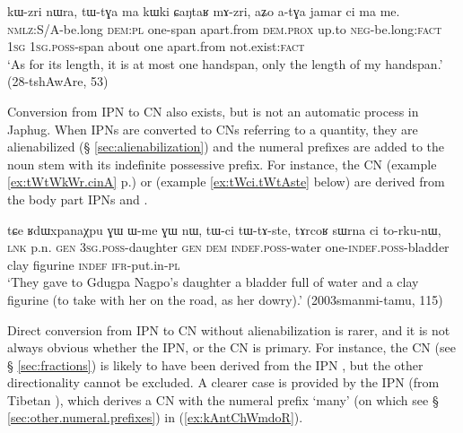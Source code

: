 \begin{exe}
\ex \label{ex:aZo.atGa}
 \gll kɯ-zri nɯra, tɯ-tɣa ma kɯki ɕaŋtaʁ mɤ-zri, aʑo a-tɣa jamar ci ma me. \\
 \textsc{nmlz}:S/A-be.long \textsc{dem}:\textsc{pl} one-span apart.from \textsc{dem}.\textsc{prox} up.to \textsc{neg}-be.long:\textsc{fact} \textsc{1sg} \textsc{1sg}.\textsc{poss}-span about one apart.from not.exist:\textsc{fact} \\
 \glt `As for its length, it is at most one handspan, only the length of my handspan.' (28-tshAwAre, 53)
\end{exe}

Conversion from IPN to CN also exists, but is not an automatic process in Japhug. When IPNs are converted to CNs referring to a quantity, they are alienabilized (§ \ref{sec:alienabilization}) and the numeral prefixes are added to the noun stem with its indefinite possessive prefix. For instance, the CN  (example \ref{ex:tWtWkWr.cinA} p.\pageref{ex:tWtWkWr.cinA}) or  (example \ref{ex:tWci.tWtAste} below) are derived from the body part IPNs  and . 

\begin{exe}
\ex \label{ex:tWci.tWtAste}
 \gll  tɕe ʁdɯxpanaχpu ɣɯ ɯ-me ɣɯ nɯ, tɯ-ci tɯ-tɤ-ste, tɤrcoʁ sɯrna ci to-rku-nɯ, \\
 \textsc{lnk} p.n. \textsc{gen} \textsc{3sg}.\textsc{poss}-daughter \textsc{gen} \textsc{dem} \textsc{indef}.\textsc{poss}-water one-\textsc{indef}.\textsc{poss}-bladder clay figurine \textsc{indef} \textsc{ifr}-put.in-\textsc{pl} \\
 \glt `They gave to Gdugpa Nagpo's daughter a bladder full of water and a clay figurine (to take with her on the road, as her dowry).' (2003smanmi-tamu, 115)
\end{exe}

Direct conversion from IPN to CN without alienabilization is rarer, and it is not always obvious whether the IPN, or the CN is primary. For instance, the CN  (see § \ref{sec:fractions}) is likely to have been derived from the IPN , but the other directionality cannot be excluded. A clearer case is provided by the IPN   (from Tibetan ), which derives a CN with the numeral prefix  `many' (on which see § \ref{sec:other.numeral.prefixes}) in (\ref{ex:kAntChWmdoR}). 

